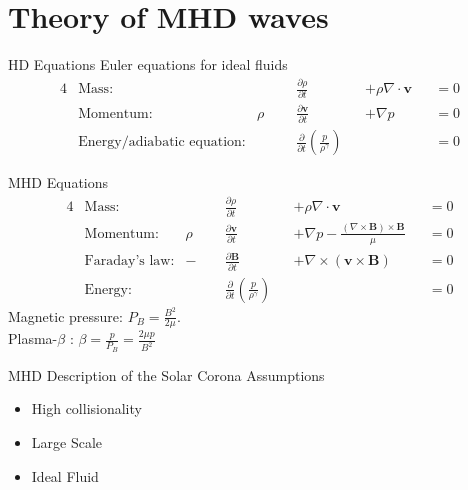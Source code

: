 \documentclass{beamer}
\begin{document}
\section{Theory of MHD waves}

\begin{frame}{HD Equations}
Euler equations for ideal fluids
\begin{alignat*}{4}
	&\text{Mass:} &\quad\quad &\frac{\partial \rho}{\partial t} & &+ \rho \nabla \cdot \mathbf v & &=  0 \\
	&\text{Momentum:} & \rho& \frac{\partial \mathbf v}{\partial t} & &+ \nabla p & &= 0\\
	&\text{Energy/adiabatic equation:} & &\frac{\partial }{\partial t} \left( \frac{p}{\rho^{\gamma}} \right)  & & & &= 0
\end{alignat*}
\end{frame}
\begin{frame}{MHD Equations}
    \begin{alignat*}{4}
	&\text{Mass:} &\quad\quad &\frac{\partial \rho}{\partial t} & & +\rho \nabla \cdot \mathbf v& &= 0 \\ 	
	&\text{Momentum:} & \rho& \frac{\partial \mathbf v}{\partial t} & &+ \nabla p - \frac{(\nabla \times \mathbf B) \times \mathbf B}{\mu}& &=  0  \\
	&\text{Faraday's law:} & -&\frac{\partial \mathbf B}{\partial t} & &+ \nabla \times (\mathbf v \times \mathbf B)& &= 0 \\
	&\text{Energy:} & &\frac{\partial }{\partial t} \left( \frac{p}{\rho^{\gamma}} \right)  & & & &= 0 
\end{alignat*}
Magnetic pressure: $P_B = \frac{B^2}{2\mu}$. \\Plasma-$\beta$ : $\beta = \frac{p}{P_B} = \frac{2\mu p}{B^2}$
\end{frame}
\begin{frame}{MHD Description of the Solar Corona}
    \centering
    Assumptions \cite{goedbloed2004principles}
    \begin{itemize}
        \item High collisionality
        \item Large Scale
        \item Ideal Fluid
    \end{itemize}
\end{frame}
\end{document}
